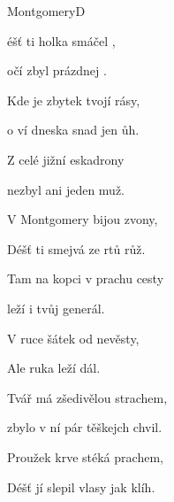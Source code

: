 \setcounter{page}{53}
\begin{song}{Montgomery}{D}{}

\begin{SBVerse}

éšť ti holka smáčel ,

 očí zbyl prázdnej .

Kde je zbytek tvojí rásy,

o ví dneska snad jen ůh.

\end{SBVerse}

\begin{SBChorus}

Z celé jižní eskadrony

nezbyl ani jeden muž.

V Montgomery bijou zvony,

Déšť ti smejvá ze rtů růž.

\end{SBChorus}

\begin{SBVerse}

Tam na kopci v prachu cesty

leží i tvůj generál.

V ruce šátek od nevěsty,

Ale ruka leží dál.

\end{SBVerse}

\begin{SBChorus}

\end{SBChorus}

\begin{SBVerse}

Tvář má zšedivělou strachem,

zbylo v ní pár těškejch chvil.

Proužek krve stéká prachem,

Déšť jí slepil vlasy jak klíh.

\end{SBVerse}

\begin{SBChorus}

\end{SBChorus}

\end{song}

\clearpage
